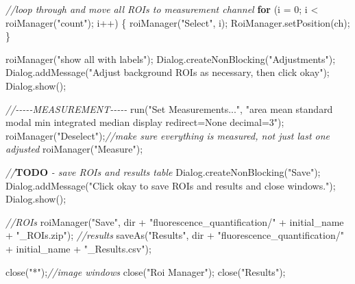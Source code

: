 \documentclass[
  12pt,
  a4paper,
]{book}
\newenvironment{Shaded}{}{}
\newcommand{\AlertTok}[1]{\textcolor[rgb]{1.00,0.00,0.00}{\textbf{#1}}}
\newcommand{\CommentTok}[1]{\textcolor[rgb]{0.38,0.63,0.69}{\textit{#1}}}
\newcommand{\ControlFlowTok}[1]{\textcolor[rgb]{0.00,0.44,0.13}{\textbf{#1}}}
\newcommand{\DecValTok}[1]{\textcolor[rgb]{0.25,0.63,0.44}{#1}}
\newcommand{\NormalTok}[1]{#1}
\newcommand{\OperatorTok}[1]{\textcolor[rgb]{0.40,0.40,0.40}{#1}}
\newcommand{\StringTok}[1]{\textcolor[rgb]{0.25,0.44,0.63}{#1}}
\begin{document}
\begin{Shaded}
\begin{Highlighting}[]
\CommentTok{//loop through and move all ROIs to measurement channel}
\ControlFlowTok{for} \OperatorTok{(}\NormalTok{i }\OperatorTok{=} \DecValTok{0}\OperatorTok{;}\NormalTok{ i }\OperatorTok{\textless{}}\NormalTok{ roiManager}\OperatorTok{(}\StringTok{"count"}\OperatorTok{);}\NormalTok{ i}\OperatorTok{++)} \OperatorTok{\{}
\NormalTok{    roiManager}\OperatorTok{(}\StringTok{"Select"}\OperatorTok{,}\NormalTok{ i}\OperatorTok{);}
\NormalTok{    RoiManager}\OperatorTok{.}\NormalTok{setPosition}\OperatorTok{(}\NormalTok{ch}\OperatorTok{);}
\OperatorTok{\}}

\NormalTok{roiManager}\OperatorTok{(}\StringTok{"show all with labels"}\OperatorTok{);}
\NormalTok{Dialog}\OperatorTok{.}\NormalTok{createNonBlocking}\OperatorTok{(}\StringTok{"Adjustments"}\OperatorTok{);}
\NormalTok{Dialog}\OperatorTok{.}\NormalTok{addMessage}\OperatorTok{(}\StringTok{"Adjust background ROIs as necessary, then click \textquotesingle{}okay\textquotesingle{}"}\OperatorTok{);}
\NormalTok{Dialog}\OperatorTok{.}\NormalTok{show}\OperatorTok{();}

\CommentTok{//{-}{-}{-}{-}{-}MEASUREMENT{-}{-}{-}{-}{-}}
\NormalTok{run}\OperatorTok{(}\StringTok{"Set Measurements..."}\OperatorTok{,} \StringTok{"area mean standard modal min integrated median display redirect=None decimal=3"}\OperatorTok{);}
\NormalTok{roiManager}\OperatorTok{(}\StringTok{"Deselect"}\OperatorTok{);}\CommentTok{//make sure everything is measured, not just last one adjusted}
\NormalTok{roiManager}\OperatorTok{(}\StringTok{"Measure"}\OperatorTok{);}

\CommentTok{//}\AlertTok{TODO}\CommentTok{ {-} save ROIs and results table}
\NormalTok{Dialog}\OperatorTok{.}\NormalTok{createNonBlocking}\OperatorTok{(}\StringTok{"Save"}\OperatorTok{);}
\NormalTok{Dialog}\OperatorTok{.}\NormalTok{addMessage}\OperatorTok{(}\StringTok{"Click \textquotesingle{}okay\textquotesingle{} to save ROIs and results and close windows."}\OperatorTok{);}
\NormalTok{Dialog}\OperatorTok{.}\NormalTok{show}\OperatorTok{();}

\CommentTok{//ROIs}
\NormalTok{roiManager}\OperatorTok{(}\StringTok{"Save"}\OperatorTok{,}\NormalTok{ dir }\OperatorTok{+} \StringTok{"fluorescence\_quantification/"} \OperatorTok{+}\NormalTok{ initial\_name }\OperatorTok{+} \StringTok{"\_ROIs.zip"}\OperatorTok{);}
\CommentTok{//results}
\NormalTok{saveAs}\OperatorTok{(}\StringTok{"Results"}\OperatorTok{,}\NormalTok{ dir }\OperatorTok{+} \StringTok{"fluorescence\_quantification/"} \OperatorTok{+}\NormalTok{ initial\_name }\OperatorTok{+} \StringTok{"\_Results.csv"}\OperatorTok{);}

\NormalTok{close}\OperatorTok{(}\StringTok{"*"}\OperatorTok{);}\CommentTok{//image windows}
\NormalTok{close}\OperatorTok{(}\StringTok{"Roi Manager"}\OperatorTok{);}
\NormalTok{close}\OperatorTok{(}\StringTok{"Results"}\OperatorTok{);}
\end{Highlighting}
\end{Shaded}
\end{document}
